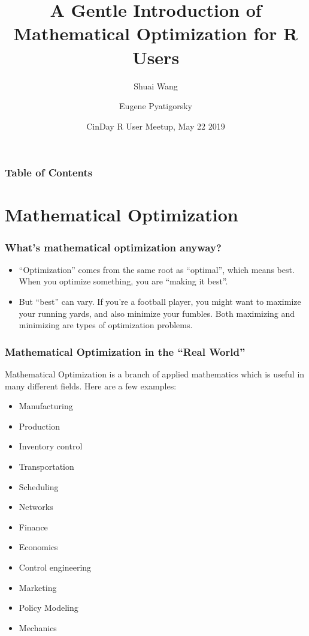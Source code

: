 \documentclass[xcolor=dvipsnames,aspectratio=169]{beamer}
\title[]{A Gentle Introduction of Mathematical Optimization for R Users}
\subtitle{library(rcbc) \& minizinc 
\newline

\href{https://github.com/shuaiwang88/intro_optimization_CinDay_R_meetup_May_22_2019}[Code]
}
\author[]{Shuai Wang \and Eugene Pyatigorsky}
\institute[] %
{84.51 Operations Research}
\date[] %
{CinDay R User Meetup, May 22 2019}
\begin{document}
\frame{\titlepage}


\begin{frame}
\frametitle{Table of Contents}
\tableofcontents
\end{frame}


\section{Mathematical Optimization}

\begin{frame}
\frametitle{What's mathematical optimization anyway?}

\begin{itemize}
    \item “Optimization” comes from the same root as “optimal”, which means best. When you
optimize something, you are “making it best”.
 
 
\item But “best” can vary. If you’re a football player, you might want to maximize your
running yards, and also minimize your fumbles. Both maximizing and minimizing are types
of optimization problems.
\end{itemize}



\end{frame}



\begin{frame}
\frametitle{Mathematical Optimization in the “Real World”}
Mathematical Optimization is a branch of applied mathematics which is useful in many different fields. Here are a few examples:
 \begin{multicols}{2}
    \begin{itemize}
        \item Manufacturing
        \item Production
        \item Inventory control
        \item Transportation
        \item Scheduling
        \item Networks
        \item Finance
        \item Economics
        \item Control engineering
        \item Marketing
        \item Policy Modeling
        \item Mechanics
    \end{itemize}
    \end{multicols}

\end{frame}
\end{document}
